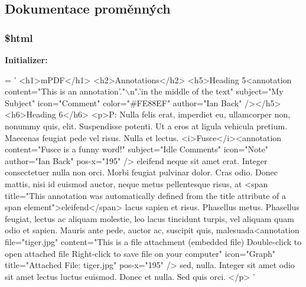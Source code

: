 \subsection{Dokumentace proměnných}
\hypertarget{example36__annotations__and___attached__files_8php_a6f96e7fc92441776c9d1cd3386663b40}{
\subsubsection[{\$html}]{\setlength{\rightskip}{0pt plus 5cm}\$html}}\label{example36__annotations__and___attached__files_8php_a6f96e7fc92441776c9d1cd3386663b40}
{\bfseries Initializer\-:}
\begin{DoxyCode}
= \textcolor{stringliteral}{'}
\textcolor{stringliteral}{<h1>mPDF</h1>}
\textcolor{stringliteral}{<h2>Annotations</h2>}
\textcolor{stringliteral}{<h5>Heading 5<annotation content="This is an annotation'}.\textcolor{stringliteral}{"\(\backslash\)n"}.\textcolor{stringliteral}{'in the middle of the text" subject="My
       Subject" icon="Comment" color="#FE88EF" author="Ian Back" /></h5>}
\textcolor{stringliteral}{<h6>Heading 6</h6>}
\textcolor{stringliteral}{<p>P: Nulla felis erat, imperdiet eu, ullamcorper non, nonummy quis, elit. Suspendisse potenti. Ut a eros
       at ligula vehicula pretium. Maecenas feugiat pede vel risus. Nulla et lectus. <i>Fusce</i><annotation
       content="Fusce is a funny word!" subject="Idle Comments" icon="Note" author="Ian Back" pos-x="195" /> eleifend
       neque sit amet erat. Integer consectetuer nulla non orci. Morbi feugiat pulvinar dolor. Cras odio. Donec mattis,
       nisi id euismod auctor, neque metus pellentesque risus, at <span title="This annotation was automatically
       defined from the title attribute of a span element">eleifend</span> lacus sapien et risus. Phasellus metus.
       Phasellus feugiat, lectus ac aliquam molestie, leo lacus tincidunt turpis, vel aliquam quam odio et sapien.
       Mauris ante pede, auctor ac, suscipit quis, malesuada<annotation file="tiger.jpg" content="This is a file
       attachment (embedded file)}
\textcolor{stringliteral}{Double-click to open attached file}
\textcolor{stringliteral}{Right-click to save file on your computer" icon="Graph" title="Attached File: tiger.jpg" pos-x="195" /> 
       sed, nulla. Integer sit amet odio sit amet lectus luctus euismod. Donec et nulla. Sed quis orci. </p>}
\textcolor{stringliteral}{}
\textcolor{stringliteral}{'}
\end{DoxyCode}


